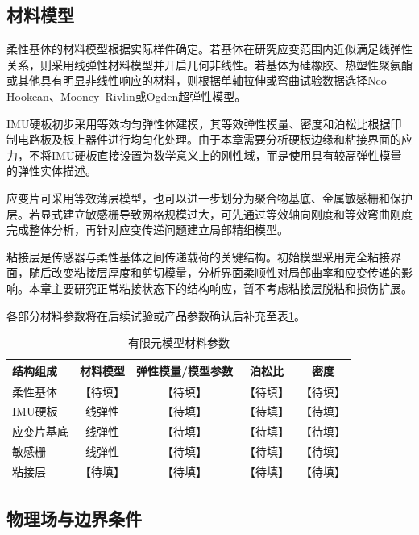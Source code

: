\subsection{材料模型}

柔性基体的材料模型根据实际样件确定。若基体在研究应变范围内近似满足线弹性关系，则采用线弹性材料模型并开启几何非线性。若基体为硅橡胶、热塑性聚氨酯或其他具有明显非线性响应的材料，则根据单轴拉伸或弯曲试验数据选择Neo-Hookean、Mooney--Rivlin或Ogden超弹性模型。

IMU硬板初步采用等效均匀弹性体建模，其等效弹性模量、密度和泊松比根据印制电路板及板上器件进行均匀化处理。由于本章需要分析硬板边缘和粘接界面的应力，不将IMU硬板直接设置为数学意义上的刚性域，而是使用具有较高弹性模量的弹性实体描述。

应变片可采用等效薄层模型，也可以进一步划分为聚合物基底、金属敏感栅和保护层。若显式建立敏感栅导致网格规模过大，可先通过等效轴向刚度和等效弯曲刚度完成整体分析，再针对应变传递问题建立局部精细模型。

粘接层是传感器与柔性基体之间传递载荷的关键结构。初始模型采用完全粘接界面，随后改变粘接层厚度和剪切模量，分析界面柔顺性对局部曲率和应变传递的影响。本章主要研究正常粘接状态下的结构响应，暂不考虑粘接层脱粘和损伤扩展。

各部分材料参数将在后续试验或产品参数确认后补充至表\ref{tab:material_parameters}。

\begin{table}[!htbp]
    \centering
    \caption{有限元模型材料参数}
    \label{tab:material_parameters}
    \begin{tabular}{lcccc}
        \toprule
        结构组成 & 材料模型 & 弹性模量/模型参数 & 泊松比 & 密度 \\
        \midrule
        柔性基体 & 【待填】 & 【待填】 & 【待填】 & 【待填】 \\
        IMU硬板 & 线弹性 & 【待填】 & 【待填】 & 【待填】 \\
        应变片基底 & 线弹性 & 【待填】 & 【待填】 & 【待填】 \\
        敏感栅 & 线弹性 & 【待填】 & 【待填】 & 【待填】 \\
        粘接层 & 【待填】 & 【待填】 & 【待填】 & 【待填】 \\
        \bottomrule
    \end{tabular}
\end{table}


\subsection{物理场与边界条件}

